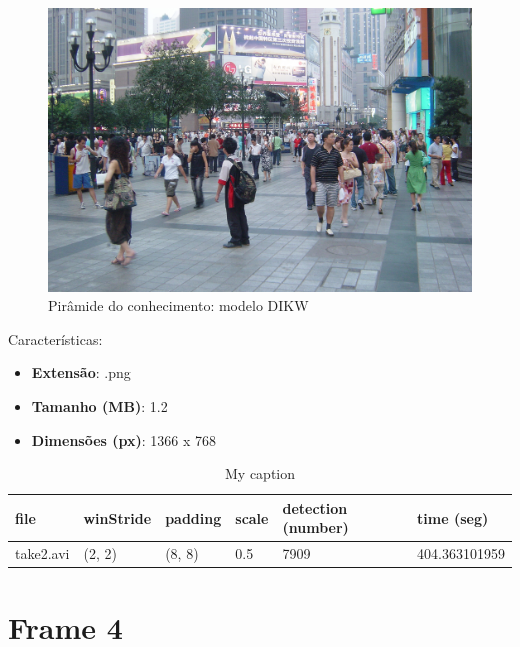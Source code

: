 \begin{figure}[!htb]
	\centering
	\includegraphics[width=\linewidth]{img/vision/frame3.JPG}
	\caption{Pirâmide do conhecimento: modelo DIKW}
	\label{db}
\end{figure}

Características: 
\begin{itemize}
	\item \textbf{Extensão}: .png
	\item \textbf{Tamanho (MB)}: 1.2
	\item \textbf{Dimensões (px)}: 1366 x 768
\end{itemize}

\begin{table}[h]
	\centering
	\begin{tabular}{|l|l|l|l|l|l|}
		\hline
		\textbf{file} & \textbf{winStride} & \textbf{padding} & \textbf{scale} & \textbf{detection (number)} & \textbf{time (seg)} \\ \hline
		take2.avi & (2, 2) & (8, 8) & 0.5 & 7909 & 404.363101959 \\ \hline
		
		
	\end{tabular}
	\caption{My caption}
	\label{my-label}
\end{table}






\newpage
\section{Frame 4}




